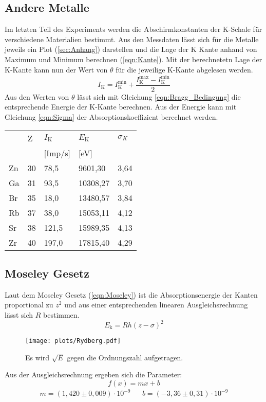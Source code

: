 \subsection{Andere Metalle}
Im letzten Teil des Experiments werden die Abschirmkonstanten der K-Schale für verschiedene Materialien bestimmt.
Aus den Messdaten lässt sich für die Metalle jeweils ein Plot (\ref{sec:Anhang}) darstellen und die Lage der K Kante anhand von Maximum und Minimum berechnen (\ref{eqn:Kante}).
Mit der berechnetetn Lage der K-Kante kann nun der Wert von $\theta$ für die jeweilige K-Kante abgelesen werden. 
\begin{equation}
    I_{\text{K}}= I_{\text{K}}^{\text{min}} + \frac{I_{\text{K}}^{\text{max}}-I_{\text{K}}^{\text{min}}}{2} \label{eqn:Kante}
\end{equation}
Aus den Werten von $\theta$ lässt sich mit Gleichung \ref{eqn:Bragg_Bedingung} die entsprechende Energie der K-Kante berechnen.
Aus der Energie kann mit Gleichung \ref{eqn:Sigma} der Absorptionskoeffizient berechnet werden.
\begin{table}[H]
\centering
\begin{tabular}{lllll}
  & Z & $I_{\text{K}}$ & $E_{\text{K}}$ & $\sigma_K$\\
  &   & [Imp/s]& [eV] &   \\
  \toprule
Zn & 30 & 78,5 & 9601,30 & 3,64 \\
\midrule
Ga & 31 & 93,5 & 10308,27 & 3,70 \\ 
\midrule
Br & 35 & 18,0 & 13480,57 & 3,84\\ 
\midrule
Rb & 37 & 38,0 & 15053,11 & 4,12 \\ 
\midrule
Sr & 38 & 121,5 & 15989,35 & 4,13 \\
\midrule
Zr & 40 & 197,0 & 17815,40 & 4,29 \\
\bottomrule
\end{tabular}
\end{table}

\subsection{Moseley Gesetz}
Laut dem Moseley Gesetz (\ref{eqn:Moseley}) ist die Absorptionsenergie der Kanten proportional zu $z^2$ und aus einer entsprechenden linearen Ausgleichsrechnung lässt sich $R$ bestimmen.
\begin{equation}
    E_{\text{k}}= Rh\left(z-\sigma\right)^2 \label{eqn:Moseley}
\end{equation}
\begin{figure}
    \centering
    \texttt{[image: plots/Rydberg.pdf]}
    \caption{Es wird $\sqrt{E}$ gegen die Ordnungszahl aufgetragen.}
    \label{fig:Moseley}
\end{figure}
Aus der Ausgleichsrechnung ergeben sich die Parameter:
\begin{equation*}
    f(x) = mx+b
\end{equation*}
\begin{align*}
    m = (1,420 \pm 0,009)\cdot 10^{-9} && b = (-3,36 \pm 0,31)\cdot 10^{-9}
\end{align*}